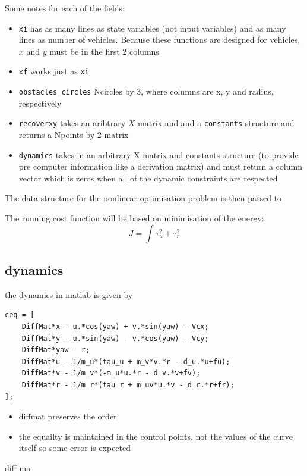 \par Some notes for each of the fields:

\begin{itemize}
    \item \texttt{xi} has as many lines as state variables (not input variables) and as many lines as number of vehicles. Because these functions are designed for vehicles, $x$ and $y$ must be in the first 2 columns
    \item \texttt{xf} works just as \texttt{xi}
    \item \texttt{obstacles\_circles}  Ncircles by 3, where columns are x, y and radius, respectively
    \item \texttt{recoverxy} takes an aribtrary $X$ matrix and and a \texttt{constants} structure and returns a Npoints by 2 matrix
    \item \texttt{dynamics} takes in an arbitrary X matrix and constants structure (to provide pre computer information like a derivation matrix) and must return a column vector which is zeros when all of the dynamic constraints are respected
\end{itemize}

\par The data structure for the nonlinear optimisation problem is then passed to 

The running cost function will be based on minimisation of the energy:
\begin{equation}
    J = \int \tau_u^2 + \tau_r^2
\end{equation}

\subsection{dynamics}

the dynamics in matlab is given by 

\begin{lstlisting}[language=matlabfloz,caption={\mcode{Matlab Function}}]
ceq = [
    DiffMat*x - u.*cos(yaw) + v.*sin(yaw) - Vcx;
    DiffMat*y - u.*sin(yaw) - v.*cos(yaw) - Vcy;
    DiffMat*yaw - r;
    DiffMat*u - 1/m_u*(tau_u + m_v*v.*r - d_u.*u+fu);
    DiffMat*v - 1/m_v*(-m_u*u.*r - d_v.*v+fv);
    DiffMat*r - 1/m_r*(tau_r + m_uv*u.*v - d_r.*r+fr);
];
\end{lstlisting}

\begin{itemize}
    \item diffmat preserves the order
    \item the equailty is maintained in the control points, not the values of the curve itself so some error is expected
\end{itemize}
diff ma

